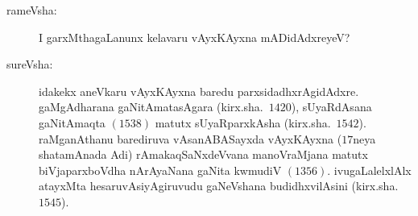 \begin{description}
\item[rameVsha:] I garxMthagaLanunx kelavaru vAyxKAyxna mADidAdxreyeV?

\item[sureVsha:] idakekx aneVkaru vAyxKAyxna baredu parxsidadhxrAgidAdxre. gaMgAdharana gaNitAmatasAgara (kirx.sha.\ $1420$), sUyaRdAsana gaNitAmaqta $(1538)$ matutx sUyaRparxkAsha (kirx.sha.\ $1542$). raMganAthanu barediruva vAsanABASayxda vAyxKAyxna ($17$neya shatamAnada Adi) rAmakaqSaNxdeVvana manoVraMjana matutx biVjaparxboVdha nArAyaNana gaNita kwmudiV $(1356)$. ivugaLalelxlAlx atayxMta hesaruvAsiyAgiruvudu gaNeVshana budidhxvilAsini (kirx.sha.\ $1545$).
\end{description}
